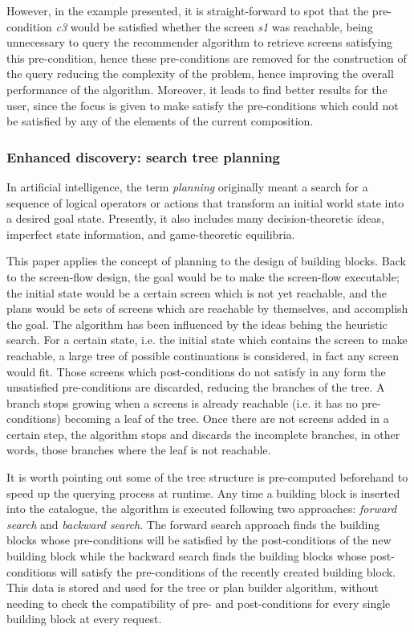 However, in the example presented, it is straight-forward to spot that the pre-condition \emph{c3} would be
satisfied whether the screen \emph{s1} was reachable, being unnecessary to query the recommender algorithm 
to retrieve screens satisfying this pre-condition, hence these pre-conditions are removed for the construction
of the query reducing the complexity of the problem, hence improving the overall performance of the algorithm.
Moreover, it leads to find better results for the user, since the focus is given to make satisfy the 
pre-conditions which could not be satisfied by any of the elements of the current composition.

\subsubsection{Enhanced discovery: search tree planning}
\label{sssec:planning}

In artiﬁcial intelligence, the term \emph{planning} originally meant a search for a sequence of logical operators or actions
that transform an initial world state into a desired goal state. Presently, it also includes many decision-theoretic ideas,
imperfect state information, and game-theoretic equilibria.

This paper applies the concept of planning to the design of building blocks. Back to the screen-flow design, the goal
would be to make the screen-flow executable; the initial state would be a certain screen which is not yet reachable, 
and the plans would be sets of screens which are reachable by themselves, and accomplish the goal. 
The algorithm has been influenced by the ideas behing the heuristic search. For a certain state, i.e. the initial 
state which contains the screen to make reachable, a large tree of possible continuations is considered, in 
fact any screen would fit. Those screens which post-conditions do not satisfy in any form the unsatisfied 
pre-conditions are discarded, reducing the branches of the tree. A branch stops growing when a screens is
already reachable (i.e. it has no pre-conditions) becoming a leaf of the tree. Once there are not screens 
added in a certain step, the algorithm stops and discards the incomplete branches, in other words, 
those branches where the leaf is not reachable.

It is worth pointing out some of the tree structure is pre-computed beforehand to speed up the querying process at runtime. 
Any time a building block is inserted into the catalogue, the algorithm is executed following two approaches: 
\emph{forward search} and \emph{backward search}. The forward search approach finds the building blocks whose 
pre-conditions will be satisfied by the post-conditions of the new building block while the backward search 
finds the building blocks whose post-conditions will satisfy the pre-conditions of the recently
created building block. This data is stored and used for the tree or plan builder algorithm, without
needing to check the compatibility of pre- and post-conditions for every single building block at every 
request. 

